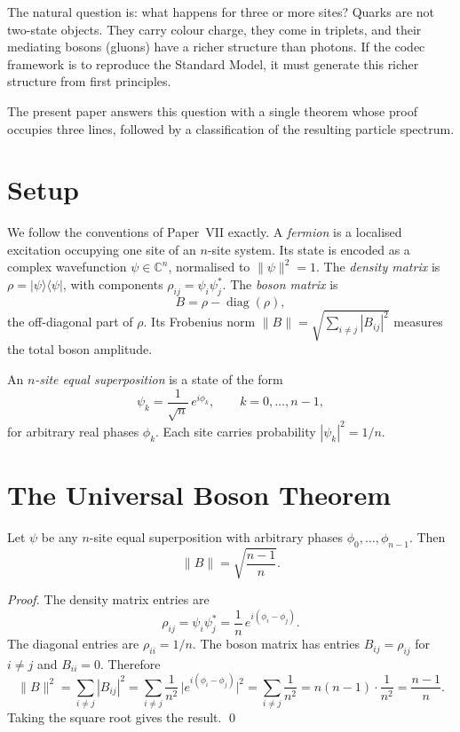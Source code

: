 \documentclass[11pt]{article}
\begin{document}
The natural question is: what happens for three or more sites?
Quarks are not two-state objects.
They carry colour charge, they come in triplets, and their mediating
bosons (gluons) have a richer structure than photons.
If the codec framework is to reproduce the Standard Model, it must
generate this richer structure from first principles.

The present paper answers this question with a single theorem whose
proof occupies three lines, followed by a classification of the
resulting particle spectrum.

\section{Setup}
\label{sec:setup}

We follow the conventions of Paper~VII exactly.
A \emph{fermion} is a localised excitation occupying one site of an
$n$-site system.
Its state is encoded as a complex wavefunction
$\psi \in \mathbb{C}^n$, normalised to $\|\psi\|^2 = 1$.
The \emph{density matrix} is $\rho = |\psi\rangle\langle\psi|$, with
components $\rho_{ij} = \psi_i \psi_j^*$.
The \emph{boson matrix} is
\[
  B = \rho - \operatorname{diag}(\rho),
\]
the off-diagonal part of $\rho$.
Its Frobenius norm $\|B\| = \sqrt{\sum_{i \neq j} |B_{ij}|^2}$ measures
the total boson amplitude.

An \emph{$n$-site equal superposition} is a state of the form
\[
  \psi_k = \frac{1}{\sqrt{n}}\,e^{i\phi_k}, \qquad k = 0, \ldots, n-1,
\]
for arbitrary real phases $\phi_k$.
Each site carries probability $|\psi_k|^2 = 1/n$.

\section{The Universal Boson Theorem}
\label{sec:theorem}

\begin{theorem}
\label{thm:main}
Let $\psi$ be any $n$-site equal superposition with arbitrary phases
$\phi_0, \ldots, \phi_{n-1}$.
Then
\[
  \|B\| = \sqrt{\frac{n-1}{n}}.
\]
\end{theorem}

\begin{proof}
The density matrix entries are
\[
  \rho_{ij} = \psi_i\psi_j^* = \frac{1}{n}\,e^{i(\phi_i - \phi_j)}.
\]
The diagonal entries are $\rho_{ii} = 1/n$.
The boson matrix has entries $B_{ij} = \rho_{ij}$ for $i \neq j$ and
$B_{ii} = 0$.
Therefore
\[
  \|B\|^2
  = \sum_{i \neq j} |B_{ij}|^2
  = \sum_{i \neq j} \frac{1}{n^2}\,\bigl|e^{i(\phi_i-\phi_j)}\bigr|^2
  = \sum_{i \neq j} \frac{1}{n^2}
  = n(n-1)\cdot\frac{1}{n^2}
  = \frac{n-1}{n}.
\]
Taking the square root gives the result. \qed
\end{proof}
\end{document}
